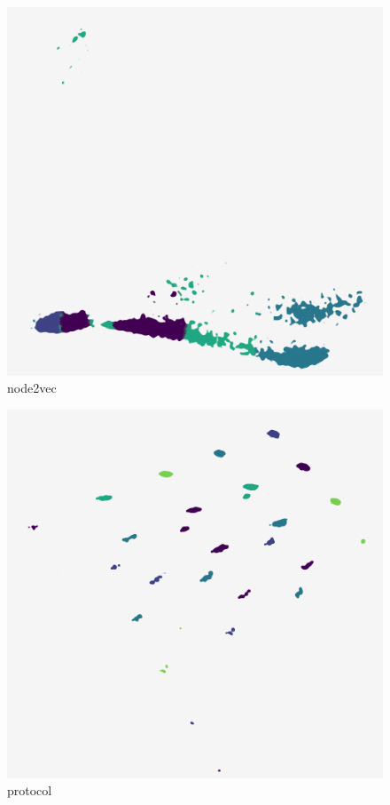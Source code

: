 \begin{subfigure}[b]{.25\linewidth}
    \centering
    \includegraphics[width=\textwidth]{outputs/DRplots/plots/AE_node2vec.png}
    \caption{node2vec}
    \label{fig:AE_node2vec}
\end{subfigure}
\begin{subfigure}[b]{.25\linewidth}
    \centering
    \includegraphics[width=\textwidth]{outputs/DRplots/plots/AE_protocol.png}
    \caption{protocol}
    \label{fig:AE_protocol}
\end{subfigure}
